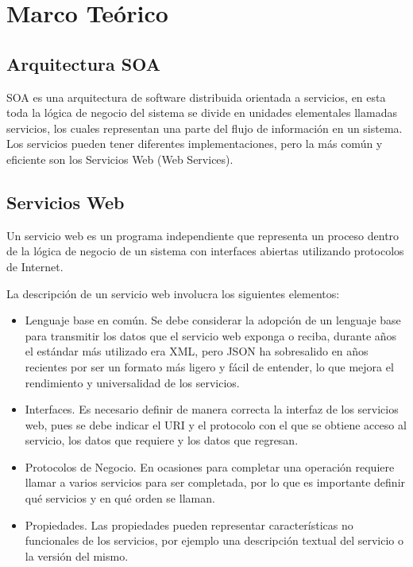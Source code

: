 \chapter{ Marco Teórico }

\section{ Arquitectura SOA }
SOA es una arquitectura de software distribuida orientada a servicios, en esta toda la lógica de negocio del sistema se divide en unidades elementales llamadas servicios, los cuales representan una parte del flujo de información en un sistema.
Los servicios pueden tener diferentes implementaciones, pero la más común y eficiente son los Servicios Web (Web Services).

\section{ Servicios Web }
Un servicio web es un programa independiente que representa un proceso dentro de la lógica de negocio de un sistema con interfaces abiertas utilizando protocolos de Internet.

La descripción de un servicio web involucra los siguientes elementos:

\begin{itemize}
\item Lenguaje base en común. Se debe considerar la adopción de un lenguaje base para transmitir los datos que el servicio web exponga o reciba, durante años el estándar más utilizado era XML, pero JSON ha sobresalido en años recientes por ser un formato más ligero y fácil de entender, lo que mejora el rendimiento y universalidad de los servicios.
\item  Interfaces. Es necesario definir de manera correcta la interfaz de los servicios web, pues se debe indicar el URI y el protocolo con el que se obtiene acceso al servicio, los datos que requiere y los datos que regresan.
\item Protocolos de Negocio. En ocasiones para completar una operación requiere llamar a varios servicios para ser completada, por lo que es importante definir qué servicios y en qué orden se llaman.
\item Propiedades. Las propiedades pueden representar características no funcionales de los servicios, por ejemplo una descripción textual del servicio o la versión del mismo.
\end{itemize}


